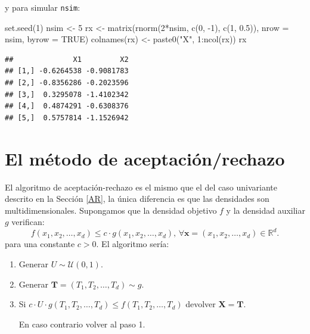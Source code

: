 \documentclass[
]{book}
\newenvironment{Shaded}{\begin{snugshade}}{\end{snugshade}}
\newcommand{\AttributeTok}[1]{\textcolor[rgb]{0.77,0.63,0.00}{#1}}
\newcommand{\ConstantTok}[1]{\textcolor[rgb]{0.00,0.00,0.00}{#1}}
\newcommand{\DecValTok}[1]{\textcolor[rgb]{0.00,0.00,0.81}{#1}}
\newcommand{\FloatTok}[1]{\textcolor[rgb]{0.00,0.00,0.81}{#1}}
\newcommand{\FunctionTok}[1]{\textcolor[rgb]{0.00,0.00,0.00}{#1}}
\newcommand{\NormalTok}[1]{#1}
\newcommand{\OtherTok}[1]{\textcolor[rgb]{0.56,0.35,0.01}{#1}}
\newcommand{\SpecialCharTok}[1]{\textcolor[rgb]{0.00,0.00,0.00}{#1}}
\newcommand{\StringTok}[1]{\textcolor[rgb]{0.31,0.60,0.02}{#1}}
\theoremstyle{break}
\theoremstyle{nonumberplain}
\begin{document}
y para simular \texttt{nsim}:

\begin{Shaded}
\begin{Highlighting}[]
\FunctionTok{set.seed}\NormalTok{(}\DecValTok{1}\NormalTok{)}
\NormalTok{nsim }\OtherTok{\textless{}{-}} \DecValTok{5}
\NormalTok{rx }\OtherTok{\textless{}{-}} \FunctionTok{matrix}\NormalTok{(}\FunctionTok{rnorm}\NormalTok{(}\DecValTok{2}\SpecialCharTok{*}\NormalTok{nsim, }\FunctionTok{c}\NormalTok{(}\DecValTok{0}\NormalTok{, }\SpecialCharTok{{-}}\DecValTok{1}\NormalTok{), }\FunctionTok{c}\NormalTok{(}\DecValTok{1}\NormalTok{, }\FloatTok{0.5}\NormalTok{)), }\AttributeTok{nrow =}\NormalTok{ nsim, }\AttributeTok{byrow =} \ConstantTok{TRUE}\NormalTok{)}
\FunctionTok{colnames}\NormalTok{(rx) }\OtherTok{\textless{}{-}} \FunctionTok{paste0}\NormalTok{(}\StringTok{"X"}\NormalTok{, }\DecValTok{1}\SpecialCharTok{:}\FunctionTok{ncol}\NormalTok{(rx))}
\NormalTok{rx}
\end{Highlighting}
\end{Shaded}

\begin{verbatim}
##              X1         X2
## [1,] -0.6264538 -0.9081783
## [2,] -0.8356286 -0.2023596
## [3,]  0.3295078 -1.4102342
## [4,]  0.4874291 -0.6308376
## [5,]  0.5757814 -1.1526942
\end{verbatim}

\hypertarget{el-muxe9todo-de-aceptaciuxf3nrechazo}{%
\section{El método de aceptación/rechazo}\label{el-muxe9todo-de-aceptaciuxf3nrechazo}}

El algoritmo de aceptación-rechazo es el mismo que el del caso univariante descrito en la Sección \ref{AR}, la única diferencia es que las densidades son multidimensionales.
Supongamos que la densidad objetivo \(f\) y la densidad
auxiliar \(g\) verifican:
\[f\left( x_1,x_2,\ldots,x_d\right) \leq c\cdot g\left( x_1,x_2,\ldots,x_d\right) 
\text{, }\forall \mathbf{x} = \left( x_1,x_2,\ldots,x_d\right)\in \mathbb{R}^d\text{.}\]
para una constante \(c>0\).
El algoritmo sería:

\begin{enumerate}
\def\labelenumi{\arabic{enumi}.}
\item
  Generar \(U\sim \mathcal{U}\left( 0,1\right)\).
\item
  Generar \(\mathbf{T} = \left( T_1,T_2,\ldots,T_d\right) \sim g\).
\item
  Si \(c\cdot U\cdot g\left( T_1,T_2,\ldots,T_d\right) \leq f\left( T_1,T_2,\ldots,T_d\right)\)
  devolver \(\mathbf{X}=\mathbf{T}\).

  En caso contrario volver al paso 1.
\end{enumerate}
\end{document}
